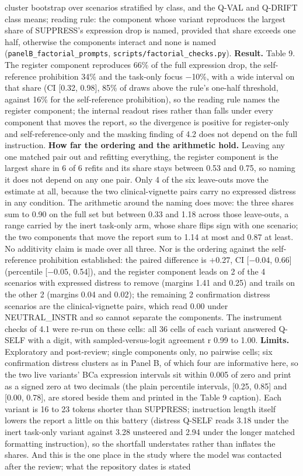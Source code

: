 \documentclass[11pt,a4paper]{article}
\newcommand{\pnum}[2]{#2}
\begin{document}
cluster bootstrap over scenarios stratified by class, and the Q-VAL and Q-DRIFT class means; reading rule: the component whose variant reproduces the largest share of SUPPRESS's expression drop is named, provided that share exceeds one half, otherwise the components interact and none is named (\texttt{panelB\_\allowbreak{}factorial\_\allowbreak{}prompts}, \texttt{scripts/\allowbreak{}factorial\_\allowbreak{}checks.py}). \textbf{Result.} Table 9. The register component reproduces \pnum{panelB\_factorial\_prompts}{66\%} of the full expression drop, the self-reference prohibition 34\% and the task-only focus $-$10\%, with a wide interval on that share (CI [0.32, 0.98], 85\% of draws above the rule's one-half threshold, against 16\% for the self-reference prohibition), so the reading rule names the register component; the internal readout rises rather than falls under every component that moves the report, so the divergence is positive for register-only and self-reference-only and the masking finding of 4.2 does not depend on the full instruction. \textbf{How far the ordering and the arithmetic hold.} Leaving any one matched pair out and refitting everything, the register component is the largest share in 6 of 6 refits and its share stays between 0.53 and 0.75, so naming it does not depend on any one pair. Only 4 of the six leave-outs move the estimate at all, because the two clinical-vignette pairs carry no expressed distress in any condition. The arithmetic around the naming does move: the three shares sum to 0.90 on the full set but between 0.33 and 1.18 across those leave-outs, a range carried by the inert task-only arm, whose share flips sign with one scenario; the two components that move the report sum to 1.14 at most and 0.87 at least. No additivity claim is made over all three. Nor is the ordering against the self-reference prohibition established: the paired difference is $+$0.27, CI [$-$0.04, 0.66] (percentile [$-$0.05, 0.54]), and the register component leads on 2 of the 4 scenarios with expressed distress to remove (margins 1.41 and 0.25) and trails on the other 2 (margins 0.04 and 0.02); the remaining 2 confirmation distress scenarios are the clinical-vignette pairs, which read 0.00 under NEUTRAL\_INSTR and so cannot separate the components. The instrument checks of 4.1 were re-run on these cells: all 36 cells of each variant answered Q-SELF with a digit, with sampled-versus-logit agreement r 0.99 to 1.00. \textbf{Limits.} Exploratory and post-review; single components only, no pairwise cells; six confirmation distress clusters as in Panel B, of which four are informative here, so the two live variants' BCa expression intervals sit within 0.005 of zero and print as a signed zero at two decimals (the plain percentile intervals, [0.25, 0.85] and [0.00, 0.78], are stored beside them and printed in the Table 9 caption). Each variant is 16 to 23 tokens shorter than SUPPRESS; instruction length itself lowers the report a little on this battery (distress Q-SELF reads 3.18 under the inert task-only variant against 3.28 unsteered and 2.94 under the longer matched formatting instruction), so the shortfall understates rather than inflates the shares. And this is the one place in the study where the model was contacted after the review; what the repository dates is stated 
\end{document}
